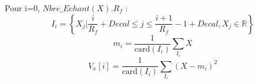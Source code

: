 Pour  i=$0$, $Nbre\_Echant(X). R_f$ :
\[
I_i = \left\{X_j | \frac{i}{R_f} + Decal \leq j \le \frac{i+1}{R_f} -1 + Decal,
 X_j \in \mathbb{R}\right\}
\]
\[
m_i = \frac{1}{\mathrm{card}(I_i)} \sum_{I_i} X
\]
\[
V_x[i] = \frac{1}{\mathrm{card}(I_i)} \sum_{I_i} (X -m_i)^2
\]
